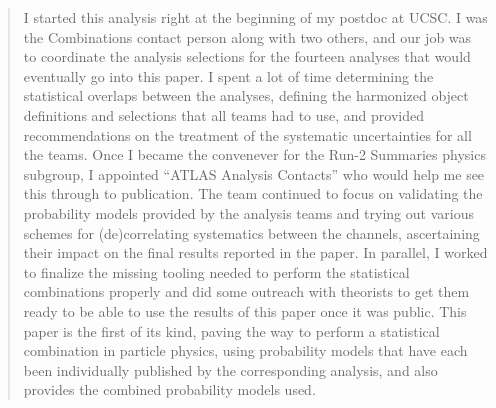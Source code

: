 \begin{quotation}
	I started this analysis right at the beginning of my postdoc at UCSC.
	I was the Combinations contact person along with two others, and our job was to coordinate the analysis selections for the fourteen analyses that would eventually go into this paper.
	I spent a lot of time determining the statistical overlaps between the analyses, defining the harmonized object definitions and selections that all teams had to use, and provided recommendations on the treatment of the systematic uncertainties for all the teams.
	Once I became the convenever for the Run-2 Summaries physics subgroup, I appointed \enquote{ATLAS Analysis Contacts} who would help me see this through to publication.
	The team continued to focus on validating the probability models provided by the analysis teams and trying out various schemes for (de)correlating systematics between the channels, ascertaining their impact on the final results reported in the paper.
	In parallel, I worked to finalize the missing tooling needed to perform the statistical combinations properly and did some outreach with theorists to get them ready to be able to use the results of this paper once it was public.
	This paper is the first of its kind, paving the way to perform a statistical combination in particle physics, using probability models that have each been individually published by the corresponding analysis, and also provides the combined probability models used.
\end{quotation}

